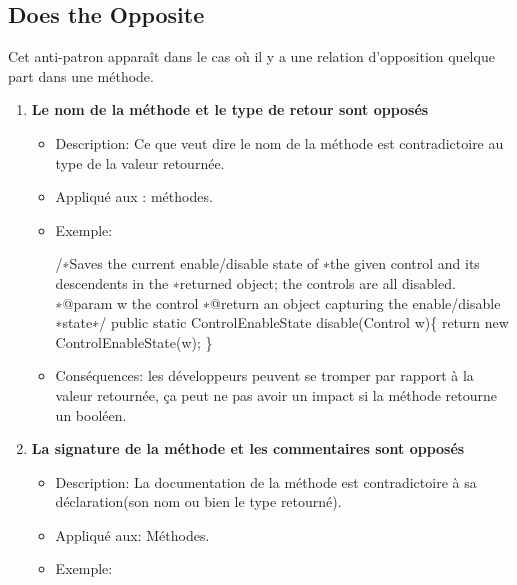 \subsection{Does the Opposite}
Cet anti-patron apparaît dans le cas où il y a une relation d'opposition quelque part dans une méthode\cite{arnaoudova2013new}.
\begin{enumerate}
    

\item \textbf {Le nom de la méthode et le type de retour sont opposés}
\begin{itemize}
\item Description: Ce que veut dire le nom de la méthode est contradictoire au type de la valeur retournée.
\item Appliqué aux : méthodes.
\item Exemple:
\begin{framed}

{\selectfont
/∗Saves the current enable/disable state of \newline
∗the given control and its descendents in the\newline
∗returned object; the controls are all disabled.\newline
∗@param w the control\newline
∗@return an object capturing the enable/disable\newline
∗state∗/\newline
public static ControlEnableState disable(Control w)\{\newline
return new ControlEnableState(w);\newline
\}

}
\end{framed}
\item Conséquences: les développeurs peuvent se tromper par rapport à la valeur retournée, ça peut ne pas avoir un impact si la méthode retourne un booléen.
\end{itemize}

\item \textbf {La signature de la méthode et les commentaires sont opposés}
\begin{itemize}
\item Description: La documentation de la méthode est contradictoire à sa déclaration(son nom ou bien le type retourné).

\item Appliqué aux: Méthodes.
\item Exemple:
\begin{framed}


\end{framed}
\end{itemize}
\end{enumerate}
